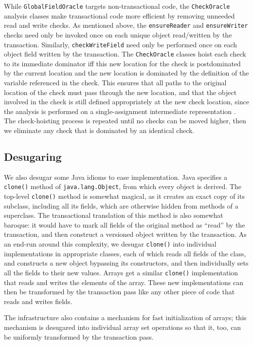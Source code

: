 While \texttt{GlobalFieldOracle} targets non-transactional code, the
\texttt{CheckOracle} analysis classes make transactional code more
efficient by removing unneeded read and write checks.  As mentioned
above, the \texttt{ensureReader} and \texttt{ensureWriter} checks need
only be invoked once on each unique object read/written by the
transaction.  Similarly, \texttt{checkWriteField} need only be
performed once on each object field written by the transaction.  The
\texttt{CheckOracle} classes hoist each check to its immediate
dominator iff this new location for the check is postdominated by the
current location and the new location is dominated by the definition
of the variable referenced in the check.  This ensures that all paths
to the original location of the check must pass through the new
location, and that the object involved in the check is still defined
appropriately at the new check location, since the analysis is
performed on a single-assignment intermediate representation
\cite{Ananian99}.  The check-hoisting process is repeated until no
checks can be moved higher, then we eliminate any check that is
dominated by an identical check.

\subsection{Desugaring} %
We also desugar some Java idioms to ease implementation.  Java
specifies a \texttt{clone()} method of \texttt{java.lang.Object},
from which every object is derived.  The top-level \texttt{clone()} method is
somewhat magical, as it creates an exact copy of its subclass,
including all its fields, which are otherwise hidden from methods of a
superclass.  The transactional translation of this method is also
somewhat baroque: it would have to mark all fields of the original
method as ``read'' by the transaction, and then construct a versioned
object written by the transaction.  As an end-run around this
complexity, we desugar \texttt{clone()} into individual
implementations in appropriate classes, each of which reads all fields
of the class, and constructs a new object bypassing its
constructors, and then individually sets all the fields to their new
values.  Arrays get a similar \texttt{clone()} implementation that
reads and writes the elements of the array.  These new implementations
can then be transformed by the transaction pass like any other piece
of code that reads and writes fields.

The \flex infrastructure also contains a mechanism for fast
initialization of arrays; this mechanism is desugared into
individual array set operations so that it, too, can be uniformly
transformed by the transaction pass.

